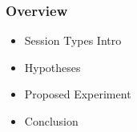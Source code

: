 \begin{frame}\frametitle{Overview}
  \begin{itemize}
    \item Session Types Intro
    \item Hypotheses
    \item Proposed Experiment
    \item Conclusion
  \end{itemize}
%
%
%

\end{frame}
